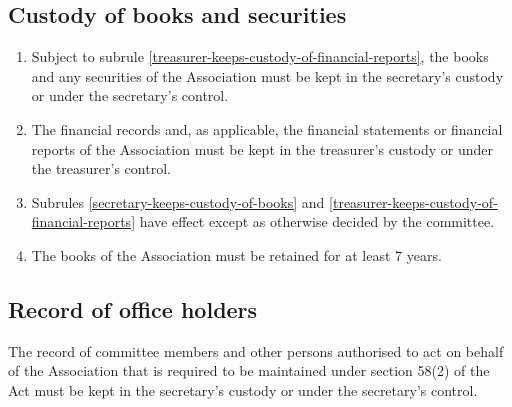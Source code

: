 \documentclass[../constitution.tex]{subfiles}
\begin{document}
\hypertarget{custody-of-books-and-securities}{%
\subsection{Custody of books and securities}\label{custody-of-books-and-securities}}

\begin{enumerate}

\item Subject to subrule \ref{treasurer-keeps-custody-of-financial-reports}, the books and any securities of the Association must be kept in the secretary's custody or under the secretary's control. \label{secretary-keeps-custody-of-books}
\item The financial records and, as applicable, the financial statements or financial reports of the Association must be kept in the treasurer's custody or under the treasurer's control. \label{treasurer-keeps-custody-of-financial-reports}
\item Subrules \ref{secretary-keeps-custody-of-books} and \ref{treasurer-keeps-custody-of-financial-reports} have effect except as otherwise decided by the committee.
\item The books of the Association must be retained for at least 7 years.
\end{enumerate}

\hypertarget{record-of-office-holders}{%
\subsection{Record of office holders}\label{record-of-office-holders}}

The record of committee members and other persons authorised to act on behalf of the Association that is required to be maintained under section 58(2) of the Act must be kept in the secretary's custody or under the secretary's control.

\end{document}

